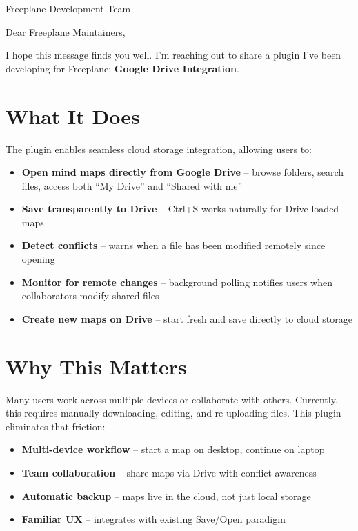 \documentclass[11pt]{letter}
\begin{document}
\begin{letter}{Freeplane Development Team}

\opening{Dear Freeplane Maintainers,}

I hope this message finds you well. I'm reaching out to share a plugin I've been developing for Freeplane: \textbf{Google Drive Integration}.

\section*{What It Does}

The plugin enables seamless cloud storage integration, allowing users to:

\begin{itemize}[nosep]
    \item \textbf{Open mind maps directly from Google Drive} -- browse folders, search files, access both ``My Drive'' and ``Shared with me''
    \item \textbf{Save transparently to Drive} -- Ctrl+S works naturally for Drive-loaded maps
    \item \textbf{Detect conflicts} -- warns when a file has been modified remotely since opening
    \item \textbf{Monitor for remote changes} -- background polling notifies users when collaborators modify shared files
    \item \textbf{Create new maps on Drive} -- start fresh and save directly to cloud storage
\end{itemize}

\section*{Why This Matters}

Many users work across multiple devices or collaborate with others. Currently, this requires manually downloading, editing, and re-uploading files. This plugin eliminates that friction:

\begin{itemize}[nosep]
    \item \textbf{Multi-device workflow} -- start a map on desktop, continue on laptop
    \item \textbf{Team collaboration} -- share maps via Drive with conflict awareness
    \item \textbf{Automatic backup} -- maps live in the cloud, not just local storage
    \item \textbf{Familiar UX} -- integrates with existing Save/Open paradigm
\end{itemize}


\end{letter}
\end{document}
